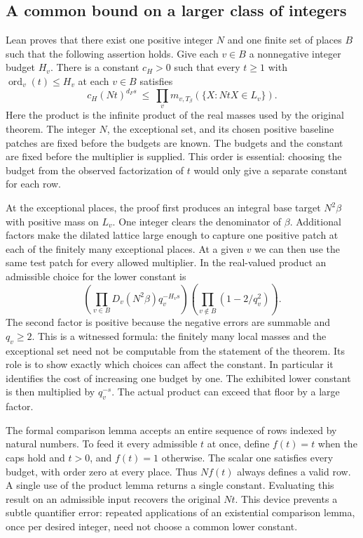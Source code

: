 \documentclass[12pt,letterpaper]{article}
\begin{document}
\subsection{A common bound on a larger class of integers}
Lean proves that there exist one positive integer $N$ and one finite set of places $B$ such that the following assertion holds. Give each $v\in B$ a nonnegative integer budget $H_v$. There is a constant $c_H>0$ such that every $t\geq1$ with $\operatorname{ord}_v(t)\leq H_v$ at each $v\in B$ satisfies
\[
 c_H (Nt)^{d_F s}
 \ \leq\ \prod_v m_{v,T_\beta}(\{X:NtX\in L_v\}).
\]
Here the product is the infinite product of the real masses used by the original theorem. The integer $N$, the exceptional set, and its chosen positive baseline patches are fixed before the budgets are known. The budgets and the constant are fixed before the multiplier is supplied. This order is essential: choosing the budget from the observed factorization of $t$ would only give a separate constant for each row.

At the exceptional places, the proof first produces an integral base target $N^2\beta$ with positive mass on $L_v$. One integer clears the denominator of $\beta$. Additional factors make the dilated lattice large enough to capture one positive patch at each of the finitely many exceptional places. At a given $v$ we can then use the same test patch for every allowed multiplier. In the real-valued product an admissible choice for the lower constant is
\[
  \left(\prod_{v\in B} D_v(N^2\beta)q_v^{-H_v s}\right)
  \left(\prod_{v\notin B}(1-2/q_v^2)\right).
\]
The second factor is positive because the negative errors are summable and $q_v\geq2$. This is a witnessed formula: the finitely many local masses and the exceptional set need not be computable from the statement of the theorem. Its role is to show exactly which choices can affect the constant. In particular it identifies the cost of increasing one budget by one. The exhibited lower constant is then multiplied by $q_v^{-s}$. The actual product can exceed that floor by a large factor.

The formal comparison lemma accepts an entire sequence of rows indexed by natural numbers. To feed it every admissible $t$ at once, define $f(t)=t$ when the caps hold and $t>0$, and $f(t)=1$ otherwise. The scalar one satisfies every budget, with order zero at every place. Thus $Nf(t)$ always defines a valid row. A single use of the product lemma returns a single constant. Evaluating this result on an admissible input recovers the original $Nt$. This device prevents a subtle quantifier error: repeated applications of an existential comparison lemma, once per desired integer, need not choose a common lower constant.
\end{document}
